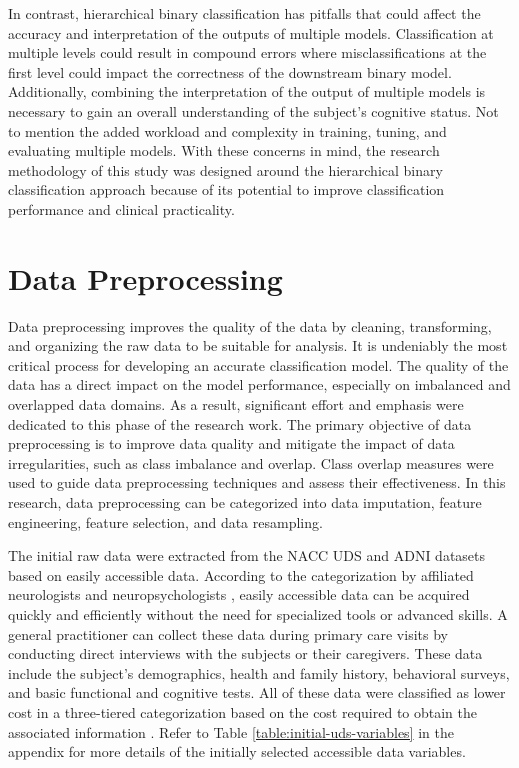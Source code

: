 In contrast, hierarchical binary classification has pitfalls that could affect the accuracy and interpretation of the outputs of multiple models. Classification at multiple levels could result in compound errors where misclassifications at the first level could impact the correctness of the downstream binary model. Additionally, combining the interpretation of the output of multiple models is necessary to gain an overall understanding of the subject's cognitive status. Not to mention the added workload and complexity in training, tuning, and evaluating multiple models. With these concerns in mind, the research methodology of this study was designed around the hierarchical binary classification approach because of its potential to improve classification performance and clinical practicality.

\section{Data Preprocessing}
Data preprocessing improves the quality of the data by cleaning, transforming, and organizing the raw data to be suitable for analysis. It is undeniably the most critical process for developing an accurate classification model. The quality of the data has a direct impact on the model performance, especially on imbalanced and overlapped data domains. As a result, significant effort and emphasis were dedicated to this phase of the research work. The primary objective of data preprocessing is to improve data quality and mitigate the impact of data irregularities, such as class imbalance and overlap. Class overlap measures were used to guide data preprocessing techniques and assess their effectiveness. In this research, data preprocessing can be categorized into data imputation, feature engineering, feature selection, and data resampling.

The initial raw data were extracted from the NACC UDS and ADNI datasets based on easily accessible data. According to the categorization by affiliated neurologists and neuropsychologists \cite{Ren2023Improving}, easily accessible data can be acquired quickly and efficiently without the need for specialized tools or advanced skills. A general practitioner can collect these data during primary care visits by conducting direct interviews with the subjects or their caregivers. These data include the subject's demographics, health and family history, behavioral surveys, and basic functional and cognitive tests. All of these data were classified as lower cost in a three-tiered categorization based on the cost required to obtain the associated information \cite{Ren2023Improving}. Refer to Table \ref{table:initial-uds-variables} in the appendix for more details of the initially selected accessible data variables.

